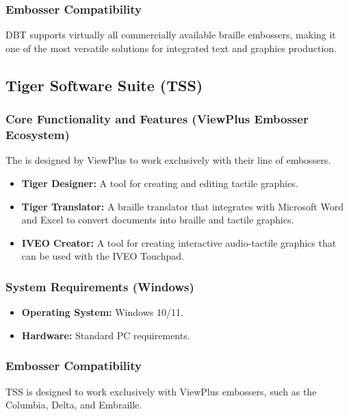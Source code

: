 \subsubsection{Embosser Compatibility}\label{ch14:sssec:dbt-compat}
DBT supports virtually all commercially available braille embossers, making it one of the most versatile solutions for integrated text and graphics production\supercite{DuxburyProducts}.

\subsection{Tiger Software Suite (TSS)}\label{ch14:ssec:tss}
\subsubsection{Core Functionality and Features (ViewPlus Embosser Ecosystem)}\label{ch14:sssec:tss-features}
The  is designed by ViewPlus\supercite{ViewplusTSS, ViewPlusTigerSuite} to work exclusively with their line of embossers.
\begin{itemize}
	\item \textbf{Tiger Designer:} A tool for creating and editing tactile graphics.
	\item \textbf{Tiger Translator:} A braille translator that integrates with Microsoft Word and Excel to convert documents into braille and tactile graphics.
	\item \textbf{IVEO Creator:} A tool for creating interactive audio-tactile graphics that can be used with the IVEO Touchpad\supercite{ViewPlusAGC}.
\end{itemize}

\subsubsection{System Requirements (Windows)}\label{ch14:sssec:tss-sysreq}
\begin{itemize}
	\item \textbf{Operating System:} Windows 10/11.
	\item \textbf{Hardware:} Standard PC requirements.
\end{itemize}

\subsubsection{Embosser Compatibility}\label{ch14:sssec:tss-compat}
TSS is designed to work exclusively with ViewPlus embossers, such as the Columbia, Delta, and Embraille\supercite{ViewPlusProduct}.

